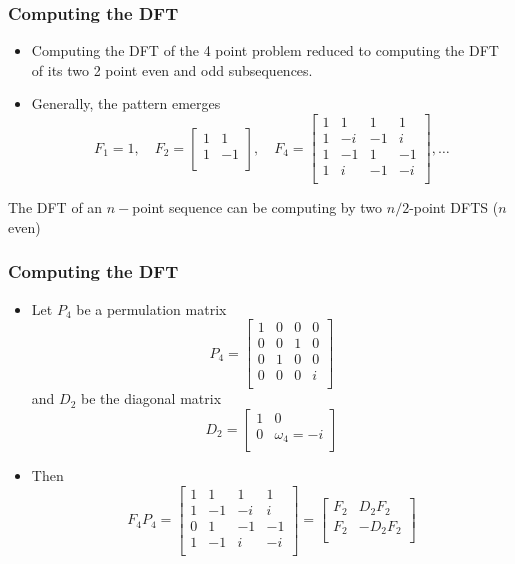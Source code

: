 \documentclass[10pt]{beamer}
\begin{document}
\begin{frame}
\frametitle{Computing the DFT}
\begin{itemize}
  \item Computing the DFT of the 4 point problem reduced to computing the DFT of
its two 2 point even and odd subsequences.

\item Generally, the pattern emerges
\[
F_1 = 1,\quad
F_2 = \begin{bmatrix}1 & 1\\ 1& -1\\\end{bmatrix},\quad
F_4 = 
\begin{bmatrix}
1 & 1 & 1 & 1\\
1 & -i & -1 & i\\
1 & -1 & 1 & -1\\
1 & i & -1 & -i\\
\end{bmatrix}
,\dots
\]
\end{itemize}
\begin{alertblock}{}
The DFT of an $n-$point sequence can be computing by two $n/2$-point DFTS ($n$
even)
\end{alertblock}
\end{frame}
\begin{frame}
\frametitle{Computing the DFT}
\begin{itemize}
  \item Let $P_4$ be a permulation matrix
\[
  P_4 =
\begin{bmatrix}
1 & 0 & 0 & 0\\
0 & 0 & 1 & 0\\
0 & 1 & 0 & 0\\
0 & 0 & 0 & i\\
\end{bmatrix}
\]
and $D_2$ be the diagonal matrix
\[
  D_2 = 
\begin{bmatrix}
1 & 0\\ 0 & \omega_4 = -i\\
\end{bmatrix}
\]

\item Then
\[
  F_4 P_4 =
\begin{bmatrix}
1 & 1 & 1 & 1\\
1 & -1 & -i & i\\
0 & 1 & -1 & -1\\
1 & -1 & i & -i\\
\end{bmatrix}
=
\begin{bmatrix}
F_2 & D_2 F_2\\
F_2 & -D_2 F_2\\
\end{bmatrix}
\]

\end{itemize}
\end{frame}
\end{document}
